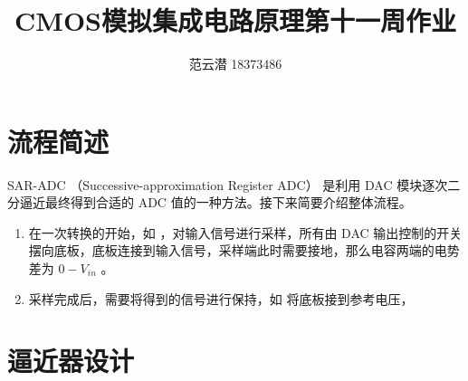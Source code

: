 \documentclass[lang=cn,11pt,a4paper,cite=authoryear]{elegantpaper}
\title{CMOS模拟集成电路原理\quad 第十一周作业}
\author{范云潜 18373486}
\institute{微电子学院 184111 班}
\date{\zhtoday}
\begin{document}
\maketitle


\tableofcontents

\listoffigures

\section{流程简述}

SAR-ADC （Successive-approximation Register ADC） 是利用 DAC 模块逐次二分逼近最终得到合适的 ADC 值的一种方法。接下来简要介绍整体流程。

\begin{enumerate}
    \item 在一次转换的开始，如  ，对输入信号进行采样，所有由 DAC 输出控制的开关摆向底板，底板连接到输入信号，采样端此时需要接地，那么电容两端的电势差为 \(0 - V_{in}\) 。
    \item 采样完成后，需要将得到的信号进行保持，如  将底板接到参考电压，
\end{enumerate}




\section{逼近器设计}





\end{document}
